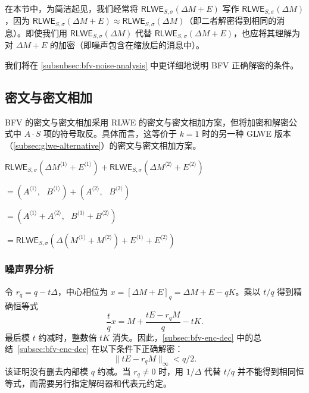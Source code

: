 在本节中，为简洁起见，我们经常将 $\textsf{RLWE}_{S,\sigma}(\Delta  M + E)$ 写作 $\textsf{RLWE}_{S,\sigma}(\Delta  M)$，因为 $\textsf{RLWE}_{S,\sigma}(\Delta M + E) \approx \textsf{RLWE}_{S,\sigma}(\Delta M)$（即二者解密得到相同的消息）。即使我们用 $\textsf{RLWE}_{S,\sigma}(\Delta  M)$ 代替 $\textsf{RLWE}_{S,\sigma}(\Delta  M + E)$，也应将其理解为对 $\Delta  M + E$ 的加密（即噪声包含在缩放后的消息中）。


我们将在 \autoref{subsubsec:bfv-noise-analysis} 中更详细地说明 BFV 正确解密的条件。



\subsection{密文与密文相加}
\label{subsec:bfv-add-cipher}

BFV 的密文与密文相加采用 RLWE 的密文与密文相加方案，但将加密和解密公式中 $A\cdot S$ 项的符号取反。具体而言，这等价于 $k = 1$ 时的另一种 GLWE 版本（\autoref{subsec:glwe-alternative}）的密文与密文相加方案。


\begin{tcolorbox}[title={\textbf{\tboxlabel{\ref*{subsec:bfv-add-cipher}} BFV 密文与密文相加}}]
$\textsf{RLWE}_{S, \sigma}(\Delta M^{\langle 1 \rangle} + E^{\langle 1 \rangle} ) + \textsf{RLWE}_{S, \sigma}(\Delta M^{\langle 2 \rangle} + E^{\langle 2 \rangle}) $

$ = ( A^{\langle 1 \rangle}, \text{ } B^{\langle 1 \rangle}) + (A^{\langle 2 \rangle}, \text{ } B^{\langle 2 \rangle}) $

$ = ( A^{\langle 1 \rangle} + A^{\langle 2 \rangle}, \text{ } B^{\langle 1 \rangle} + B^{\langle 2 \rangle} ) $

$= \textsf{RLWE}_{S, \sigma}(\Delta(M^{\langle 1 \rangle} + M^{\langle 2 \rangle}) + E^{\langle 1 \rangle} + E^{\langle 2 \rangle})$
\end{tcolorbox}


\subsubsection{噪声界分析}
\label{subsubsec:bfv-noise-analysis}

令 $r_q=q-t\Delta$，中心相位为 $x=[\Delta M+E]_q=\Delta M+E-qK$。乘以 $t/q$ 得到精确恒等式
\[
\frac{t}{q}x=M+\frac{tE-r_qM}{q}-tK.
\]
最后模 $t$ 约减时，整数倍 $tK$ 消失。因此，\autoref{subsec:bfv-enc-dec} 中的总结~\ref*{subsec:bfv-enc-dec} 在以下条件下正确解密：
\[
\|tE-r_qM\|_\infty<q/2.
\]
该证明没有删去内部模 $q$ 约减。当 $r_q\ne0$ 时，用 $1/\Delta$ 代替 $t/q$ 并不能得到相同恒等式，而需要另行指定解码器和代表元约定。

